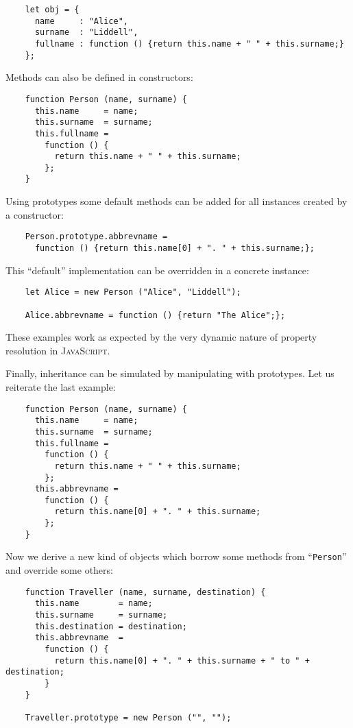 \documentclass{article}
\newcommand{\js}{\textsc{JavaScript}\xspace}
\begin{document}
\begin{lstlisting}
    let obj = {
      name     : "Alice",
      surname  : "Liddell",
      fullname : function () {return this.name + " " + this.surname;}
    };
\end{lstlisting}

Methods can also be defined in constructors:

\begin{lstlisting}
    function Person (name, surname) {
      this.name     = name;
      this.surname  = surname;
      this.fullname =
        function () {
          return this.name + " " + this.surname;
        };
    }
\end{lstlisting}

Using prototypes some default methods can be added for all instances created by
a constructor:

\begin{lstlisting}
    Person.prototype.abbrevname =
      function () {return this.name[0] + ". " + this.surname;};
\end{lstlisting}

This ``default'' implementation can be overridden in a concrete instance:

\begin{lstlisting}
    let Alice = new Person ("Alice", "Liddell");

    Alice.abbrevname = function () {return "The Alice";};
\end{lstlisting}

These examples work as expected by the very dynamic nature of property resolution in \js.

Finally, inheritance can be simulated by manipulating with prototypes. Let us
reiterate the last example:

\begin{lstlisting}
    function Person (name, surname) {
      this.name     = name;
      this.surname  = surname;
      this.fullname =
        function () {
          return this.name + " " + this.surname;
        };
      this.abbrevname =
        function () {
          return this.name[0] + ". " + this.surname; 
        };
    }
\end{lstlisting}

Now we derive a new kind of objects which borrow some methods from
``\lstinline|Person|'' and override some others:

\begin{lstlisting}
    function Traveller (name, surname, destination) {
      this.name        = name;
      this.surname     = surname;
      this.destination = destination;
      this.abbrevname  =
        function () {
          return this.name[0] + ". " + this.surname + " to " + destination; 
        }
    }

    Traveller.prototype = new Person ("", "");
\end{lstlisting}
\end{document}
